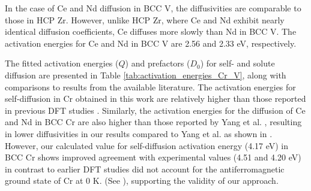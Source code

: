 \documentclass[preprint,12pt]{elsarticle}
\begin{document}
In the case of Ce and Nd diffusion in BCC V, the diffusivities are comparable to those in HCP Zr. However, unlike HCP Zr, where Ce and Nd exhibit nearly identical diffusion coefficients, Ce diffuses more slowly than Nd in BCC V. The activation energies for Ce and Nd in BCC V are 2.56 and 2.33 eV, respectively. 

The fitted activation energies ($Q$) and prefactors ($D_0$) for self- and solute diffusion are presented in Table \ref{tab:activation_energies_Cr_V}, along with comparisons to results from the available literature. The activation energies for self-diffusion in Cr obtained in this work are relatively higher than those reported in previous DFT studies \citep{yang_significant_2023,nguyen_bcc_2006, fattahpour_understanding_2022}. Similarly, the activation energies for the diffusion of Ce and Nd in BCC Cr are also higher than those reported by Yang et al. \cite{yang_significant_2023}, resulting in lower diffusivities in our results compared to Yang et al. as shown in . However, our calculated value for self-diffusion activation energy (4.17 eV) in BCC Cr shows improved agreement with experimental values (4.51 and 4.20 eV) \cite{mundy1976isotope, mundy1981self} in contrast to earlier DFT studies did not account for the antiferromagnetic ground state of Cr at 0 K.
(See ), supporting the validity of our approach.
\end{document}
